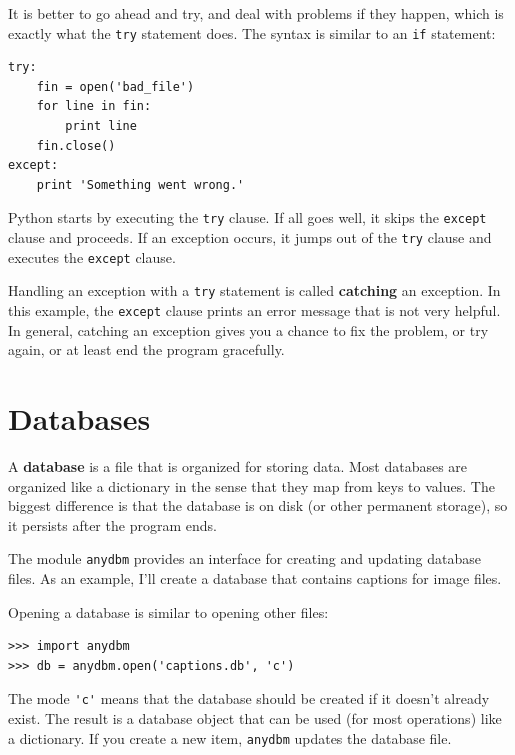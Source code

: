 \documentclass[10pt]{book}
\begin{document}

It is better to go ahead and try, and deal with problems if they
happen, which is exactly what the {\tt try} statement does.  The
syntax is similar to an {\tt if} statement:

\beforeverb
\begin{verbatim}
try:    
    fin = open('bad_file')
    for line in fin:
        print line
    fin.close()
except:
    print 'Something went wrong.'
\end{verbatim}
\afterverb
%
Python starts by executing the {\tt try} clause.  If all goes
well, it skips the {\tt except} clause and proceeds.  If an
exception occurs, it jumps out of the {\tt try} clause and
executes the {\tt except} clause.

Handling an exception with a {\tt try} statement is called {\bf
catching} an exception.  In this example, the {\tt except} clause
prints an error message that is not very helpful.  In general,
catching an exception gives you a chance to fix the problem, or try
again, or at least end the program gracefully.


\section{Databases}


A {\bf database} is a file that is organized for storing data.
Most databases are organized like a dictionary in the sense
that they map from keys to values.  The biggest difference
is that the database is on disk (or other permanent storage),
so it persists after the program ends.


The module {\tt anydbm} provides an interface for creating
and updating database files.  As an example, I'll create a database
that contains captions for image files.


Opening a database is similar
to opening other files:

\beforeverb
\begin{verbatim}
>>> import anydbm
>>> db = anydbm.open('captions.db', 'c')
\end{verbatim}
\afterverb
%
The mode \verb"'c'" means that the database should be created if
it doesn't already exist.  The result is a database object
that can be used (for most operations) like a dictionary.
If you create a new item, {\tt anydbm} updates the database file.
\end{document}
